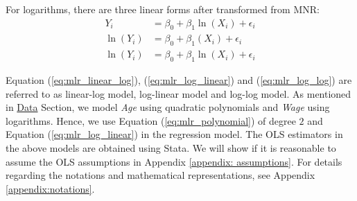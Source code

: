 For logarithms, there are three linear forms after transformed from \acs{MNR}:
\begin{align}
{Y_{i}}&=\beta_{0}+\beta_{1}\ln({X_{i}})+\epsilon_{i}\label{eq:mlr_linear_log}\\
\ln({Y_{i}})&=\beta_{0}+\beta_{1}({X_{i}})+\epsilon_{i}\label{eq:mlr_log_linear}\\
\ln({Y_{i}})&=\beta_{0}+\beta_{1}\ln({X_{i}})+\epsilon_{i}\label{eq:mlr_log_log}
\end{align}

Equation (\ref{eq:mlr_linear_log}), (\ref{eq:mlr_log_linear}) and (\ref{eq:mlr_log_log}) are referred to as linear-log model, log-linear model and log-log model. As mentioned in \hyperref[sec:data]{Data} Section, we model \textit{Age} using quadratic polynomials and \textit{Wage} using logarithms. Hence, we use Equation (\ref{eq:mlr_polynomial}) of degree $2$ and Equation (\ref{eq:mlr_log_linear}) in the regression model. The \acs{OLS} estimators in the above models are obtained using Stata. We will show if it is reasonable to assume the \acs{OLS} assumptions in Appendix \ref{appendix: assumptions}. For details regarding the notations and mathematical representations, see Appendix \ref{appendix:notations}.